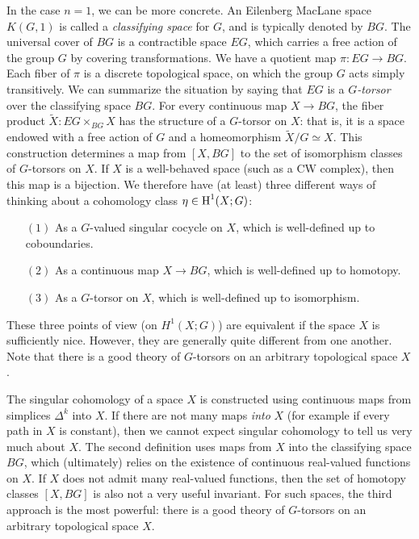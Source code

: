 In the case $n=1$, we can be more concrete. An Eilenberg MacLane space $K(G,1)$
is called a {\it classifying space} for $G$, and is typically denoted by $BG$. The universal cover
of $BG$ is a contractible space $EG$, which carries a free action of the group $G$ by covering transformations. We have a quotient map $\pi: EG \rightarrow BG$.
Each fiber of $\pi$ is a discrete topological space, on which the group $G$ acts simply transitively. We can summarize the situation by saying that $EG$ is a {\it $G$-torsor} over the classifying space $BG$.
For every continuous map $X \rightarrow BG$, the fiber product $\widetilde{X}: EG \times_{BG} X$ has the structure of a $G$-torsor on $X$: that is, it is a space endowed with a free action of $G$ and
a homeomorphism $\widetilde{X} / G \simeq X$. This construction determines a map
from $[X, BG]$ to the set of isomorphism classes of $G$-torsors on $X$. If $X$ is a well-behaved space (such as a CW complex), then this map is a bijection. We therefore have (at least) three different ways of thinking about a cohomology class $\eta \in \operatorname{H}^{1}(X; G)$:
\begin{itemize}
\item[$(1)$] As a $G$-valued singular cocycle on $X$, which is well-defined up to coboundaries.
\item[$(2)$] As a continuous map $X \rightarrow BG$, which is well-defined up to homotopy.
\item[$(3)$] As a $G$-torsor on $X$, which is well-defined up to isomorphism.
\end{itemize}
\begin{shaded}
These three points of view (on $H^1(X;G)$) are equivalent if the space $X$ is sufficiently nice.
However, they are generally quite different from one another. Note that there is a good theory of
$G$-torsors on an arbitrary topological space $X$.
\end{shaded}
 The singular cohomology of a space $X$ is constructed using continuous maps from simplices $\Delta^k$ into $X$. If there are not many maps {\em into} $X$ (for example if every path in $X$ is constant), then we cannot expect singular cohomology to tell us very much about $X$. The second definition
uses maps from $X$ into the classifying space $BG$, which
(ultimately) relies on the existence of continuous real-valued
functions on $X$. If $X$ does not admit many real-valued
functions, then the set of homotopy classes $[X, BG]$ is also not a very useful invariant.
For such spaces, the third approach is the most powerful: there is a good theory of
$G$-torsors on an arbitrary topological space $X$. 

